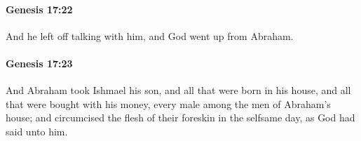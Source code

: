 		\paragraph{Genesis 17:22} %
			\label{GENESIS-17-22}

			And he left off talking with him, and God went up from Abraham.


		\paragraph{Genesis 17:23} %
			\label{GENESIS-17-23}

			And Abraham took Ishmael his son, and all that were born in his house, and all that were bought with his money, every male among the men of Abraham's house; and circumcised the flesh of their foreskin in the selfsame day, as God had said unto him.



